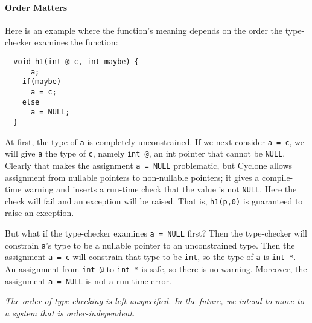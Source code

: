 \paragraph{Order Matters}
Here is an example where the function's meaning depends on the order
the type-checker examines the function:
\begin{verbatim}
  void h1(int @ c, int maybe) {
    _ a;
    if(maybe)
      a = c;
    else
      a = NULL;
  }
\end{verbatim}
At first, the type of \texttt{a} is completely unconstrained.  If we
next consider \texttt{a = c}, we will give \texttt{a} the type of
\texttt{c}, namely \texttt{int @}, an int pointer that cannot be
\texttt{NULL}.  Clearly that makes the assignment \texttt{a = NULL}
problematic, but Cyclone allows assignment from nullable pointers to
non-nullable pointers; it gives a compile-time warning and inserts a
run-time check that the value is not \texttt{NULL}.  Here the check will
fail and an exception will be raised.  That is, \texttt{h1(p,0)} is
guaranteed to raise an exception.

But what if the type-checker examines \texttt{a = NULL} first?  Then the
type-checker will constrain \texttt{a}'s type to be a nullable pointer
to an unconstrained type.  Then the assignment \texttt{a = c} will
constrain that type to be \texttt{int}, so the type of \texttt{a} is
\texttt{int *}.  An assignment from \texttt{int @} to \texttt{int *} is
safe, so there is no warning.  Moreover, the assignment \texttt{a = NULL} is
not a run-time error.

\emph{The order of type-checking is left unspecified.  In the future,
  we intend to move to a system that is order-independent.}

